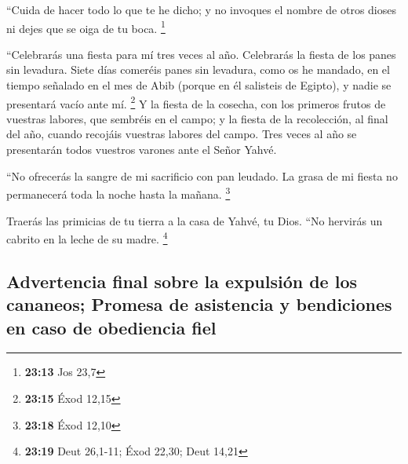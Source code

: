 \begin{paracol}{2}
 ``Cuida de hacer todo lo que te he dicho; y no invoques
el nombre de otros dioses ni dejes que se oiga de tu boca. \footnote{\textbf{23:13}
  Jos 23,7}

 ``Celebrarás una fiesta para mí tres veces al año.
 Celebrarás la fiesta de los panes sin levadura. Siete
días comeréis panes sin levadura, como os he mandado, en el tiempo
señalado en el mes de Abib (porque en él salisteis de Egipto), y nadie
se presentará vacío ante mí. \footnote{\textbf{23:15} Éxod 12,15}
 Y la fiesta de la cosecha, con los primeros frutos de
vuestras labores, que sembréis en el campo; y la fiesta de la
recolección, al final del año, cuando recojáis vuestras labores del
campo.  Tres veces al año se presentarán todos vuestros
varones ante el Señor Yahvé.

 ``No ofrecerás la sangre de mi sacrificio con pan
leudado. La grasa de mi fiesta no permanecerá toda la noche hasta la
mañana. \footnote{\textbf{23:18} Éxod 12,10}

 Traerás las primicias de tu tierra a la casa de Yahvé,
tu Dios. ``No hervirás un cabrito en la leche de su madre. \footnote{\textbf{23:19}
  Deut 26,1-11; Éxod 22,30; Deut 14,21}

\hypertarget{advertencia-final-sobre-la-expulsiuxf3n-de-los-cananeos-promesa-de-asistencia-y-bendiciones-en-caso-de-obediencia-fiel}{%
\subsection{Advertencia final sobre la expulsión de los cananeos;
Promesa de asistencia y bendiciones en caso de obediencia
fiel}\label{advertencia-final-sobre-la-expulsiuxf3n-de-los-cananeos-promesa-de-asistencia-y-bendiciones-en-caso-de-obediencia-fiel}}


\end{paracol}
